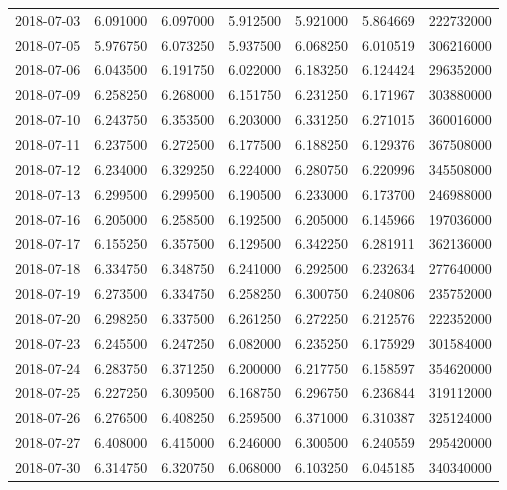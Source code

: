 \begin{tabular}{lrrrrrr}
2018-07-03 &    6.091000 &    6.097000 &    5.912500 &    5.921000 &    5.864669 &   222732000 \\
2018-07-05 &    5.976750 &    6.073250 &    5.937500 &    6.068250 &    6.010519 &   306216000 \\
2018-07-06 &    6.043500 &    6.191750 &    6.022000 &    6.183250 &    6.124424 &   296352000 \\
2018-07-09 &    6.258250 &    6.268000 &    6.151750 &    6.231250 &    6.171967 &   303880000 \\
2018-07-10 &    6.243750 &    6.353500 &    6.203000 &    6.331250 &    6.271015 &   360016000 \\
2018-07-11 &    6.237500 &    6.272500 &    6.177500 &    6.188250 &    6.129376 &   367508000 \\
2018-07-12 &    6.234000 &    6.329250 &    6.224000 &    6.280750 &    6.220996 &   345508000 \\
2018-07-13 &    6.299500 &    6.299500 &    6.190500 &    6.233000 &    6.173700 &   246988000 \\
2018-07-16 &    6.205000 &    6.258500 &    6.192500 &    6.205000 &    6.145966 &   197036000 \\
2018-07-17 &    6.155250 &    6.357500 &    6.129500 &    6.342250 &    6.281911 &   362136000 \\
2018-07-18 &    6.334750 &    6.348750 &    6.241000 &    6.292500 &    6.232634 &   277640000 \\
2018-07-19 &    6.273500 &    6.334750 &    6.258250 &    6.300750 &    6.240806 &   235752000 \\
2018-07-20 &    6.298250 &    6.337500 &    6.261250 &    6.272250 &    6.212576 &   222352000 \\
2018-07-23 &    6.245500 &    6.247250 &    6.082000 &    6.235250 &    6.175929 &   301584000 \\
2018-07-24 &    6.283750 &    6.371250 &    6.200000 &    6.217750 &    6.158597 &   354620000 \\
2018-07-25 &    6.227250 &    6.309500 &    6.168750 &    6.296750 &    6.236844 &   319112000 \\
2018-07-26 &    6.276500 &    6.408250 &    6.259500 &    6.371000 &    6.310387 &   325124000 \\
2018-07-27 &    6.408000 &    6.415000 &    6.246000 &    6.300500 &    6.240559 &   295420000 \\
2018-07-30 &    6.314750 &    6.320750 &    6.068000 &    6.103250 &    6.045185 &   340340000 \\

\end{tabular}
